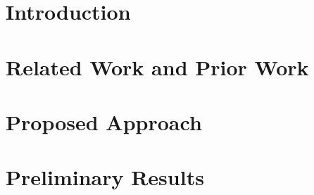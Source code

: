 \documentclass[letterpaper%
, twoside%
, 12pt%
,these%
, english%
,creativecommons,hyperref%
]{thETS}
\begin{document}


\cleardoublepage


\reversemarginpar


\chapter{Introduction}




\chapter{Related Work and Prior Work}


\chapter{Proposed Approach}



\chapter{Preliminary Results}

%
%


\end{document}
